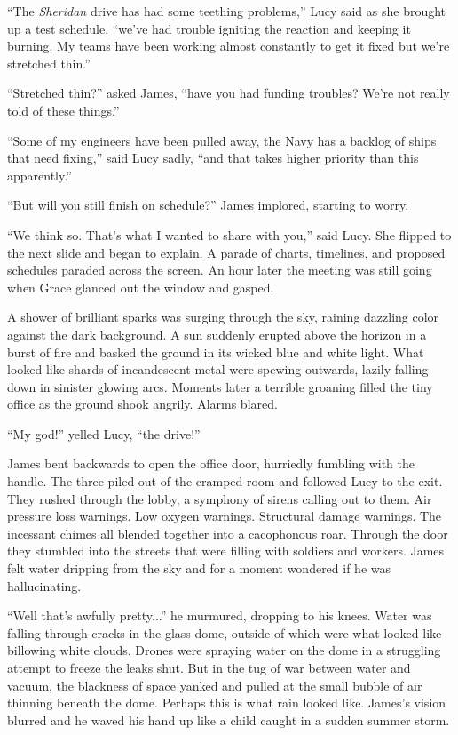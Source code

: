 \documentclass[12pt]{article} %
\begin{document}
``The \textit{Sheridan} drive has had some teething problems,'' Lucy said as she brought up a test schedule, ``we've had trouble igniting the reaction and keeping it burning. My teams have been working almost constantly to get it fixed but we're stretched thin.''

``Stretched thin?'' asked James, ``have you had funding troubles? We're not really told of these things.''

``Some of my engineers have been pulled away, the Navy has a backlog of ships that need fixing,'' said Lucy sadly, ``and that takes higher priority than this apparently.''

``But will you still finish on schedule?'' James implored, starting to worry. 

``We think so. That's what I wanted to share with you,'' said Lucy. She flipped to the next slide and began to explain. A parade of charts, timelines, and proposed schedules paraded across the screen. An hour later the meeting was still going when Grace glanced out the window and gasped.

A shower of brilliant sparks was surging through the sky, raining dazzling color against the dark background. A sun suddenly erupted above the horizon in a burst of fire and basked the ground in its wicked blue and white light. What looked like shards of incandescent metal were spewing outwards, lazily falling down in sinister glowing arcs. Moments later a terrible groaning filled the tiny office as the ground shook angrily. Alarms blared.

``My god!'' yelled Lucy, ``the drive!''

James bent backwards to open the office door, hurriedly fumbling with the handle. The three piled out of the cramped room and followed Lucy to the exit. They rushed through the lobby, a symphony of sirens calling out to them. Air pressure loss warnings. Low oxygen warnings. Structural damage warnings. The incessant chimes all blended together into a cacophonous roar. Through the door they stumbled into the streets that were filling with soldiers and workers. James felt water dripping from the sky and for a moment wondered if he was hallucinating.

``Well that's awfully pretty...'' he murmured, dropping to his knees. Water was falling through cracks in the glass dome, outside of which were what looked like billowing white clouds. Drones were spraying water on the dome in a struggling attempt to freeze the leaks shut. But in the tug of war between water and vacuum, the blackness of space yanked and pulled at the small bubble of air thinning beneath the dome. Perhaps this is what rain looked like. James's vision blurred and he waved his hand up like a child caught in a sudden summer storm.
\end{document}
